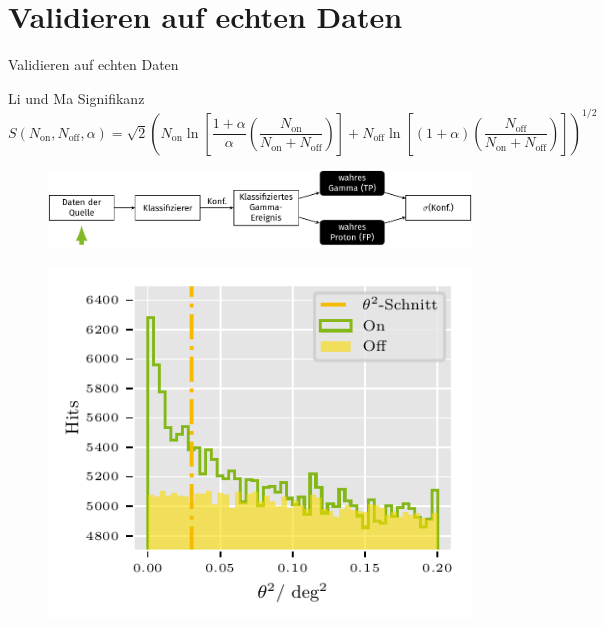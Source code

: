 \documentclass[aspectratio=1610, professionalfonts, 9pt]{beamer}
\begin{document}
\section{Validieren auf echten Daten}

\begin{frame}{Validieren auf echten Daten}
	\begin{block}{Li und Ma Signifikanz}
	  \begin{equation*}
		S\left( N_\text{on}, N_\text{off}, \alpha \right) = \sqrt{2} \left( N_\text{on} \ln \left[ \frac{1+ \alpha}{\alpha}\left( \frac{N_\text{on}}{N_\text{on} + N_\text{off}} \right) \right] + N_\text{off} \ln \left[ \left( 1+ \alpha \right) \left( \frac{N_\text{off}}{N_\text{on} + N_\text{off}} \right) \right] \right)^{1/2}
	  \end{equation*}
	\end{block}
\end{frame}

\begin{frame}
  \begin{minipage}[t][0.25\textheight][t]{\textwidth}
	  \begin{figure}
		\includegraphics[scale=0.5]{./tikz/Conf/Conf1.pdf}
	  \end{figure}
  \end{minipage}
  \begin{minipage}[t][0.75\textheight][t]{\textwidth}
	  \begin{figure}
		\centering
		\includegraphics[height=0.7\textheight]{./Plots/on_off_ratio.pdf}
	  \end{figure}
  \end{minipage}
\end{frame}
\end{document}

